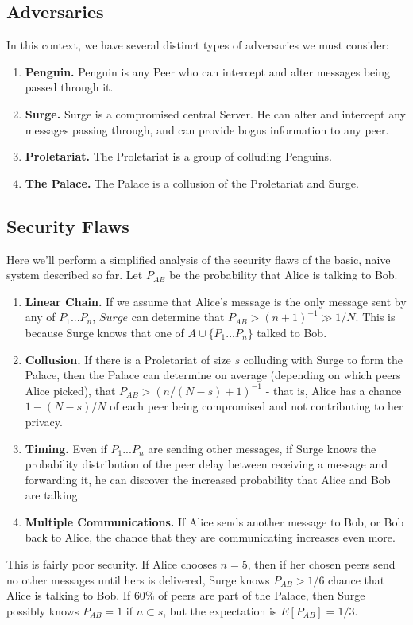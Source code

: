 \documentclass{paper}
\begin{document}
\subsection{Adversaries}
In this context, we have several distinct types of adversaries we must consider:
\begin{enumerate}
  \item\textbf{Penguin.} Penguin is any Peer who can intercept and alter messages being passed through it. 
  \item\textbf{Surge.} Surge is a compromised central Server. He can alter and intercept any messages passing through, and can provide bogus information to any peer.
  \item\textbf{Proletariat.} The Proletariat is a group of colluding Penguins.
  \item\textbf{The Palace.} The Palace is a collusion of the Proletariat and Surge.
\end{enumerate}
\subsection{Security Flaws}
Here we'll perform a simplified analysis of the security flaws of the basic, naive system described so far. 
Let $P_{AB}$ be the probability that Alice is talking to Bob. 
\begin{enumerate}
\item\textbf{Linear Chain.} If we assume that Alice's message is the only message sent by any of $P_1 ... P_n$, $Surge$ can determine that $P_{AB} > (n+1)^{-1} \gg 1/N$. This is because Surge knows that one of $A \cup \{P_1 ... P_n\}$ talked to Bob.
\item\textbf{Collusion.} If there is a Proletariat of size $s$ colluding with Surge to form the Palace, then the Palace can determine on average (depending on which peers Alice picked), that $P_{AB} > (n/(N-s)+1)^{-1}$ - that is, Alice has a chance $1 - (N-s)/N$ of each peer being compromised and not contributing to her privacy.
\item\textbf{Timing.} Even if $P_1 ... P_n$ are sending other messages, if Surge knows the probability distribution of the peer delay between receiving a message and forwarding it, he can discover the increased probability that Alice and Bob are talking. 
\item\textbf{Multiple Communications.} If Alice sends another message to Bob, or Bob back to Alice, the chance that they are communicating increases even more. 
\end{enumerate}
This is fairly poor security. If Alice chooses $n = 5$, then if her chosen peers send no other messages until hers is delivered, Surge knows $P_{AB} > 1/6$ chance that Alice is talking to Bob. If $60\%$ of peers are part of the Palace, then Surge possibly knows $P_{AB} = 1$ if $n \subset s$, but the expectation is $E[P_{AB}] = 1/3$.
\end{document}
